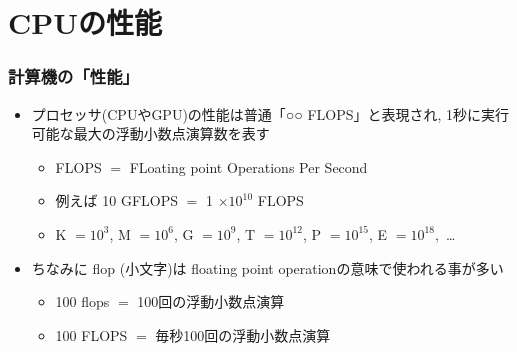 \documentclass[10pt,dvipdfmx]{beamer}
\newcommand{\ao}[1]{{\color{blue}#1}}
\begin{document}
\section{CPUの性能}

\begin{frame}
  \frametitle{計算機の「性能」}
  \begin{itemize}
  \item<1-> プロセッサ(CPUやGPU)の性能は普通\ao{「○○ FLOPS」}と表現され,
    1秒に実行可能な最大の\ao{浮動小数点演算数}を表す
    \begin{itemize}
    \item<2-> \ao{FLOPS} $=$ \ao{FL}oating point \ao{O}perations
      \ao{P}er \ao{S}econd
    \item<3-> 例えば 10 GFLOPS $=$ 1 $\times 10^{10}$ FLOPS
    \item<3->
      K $= 10^3$,
      M $= 10^6$,
      G $= 10^9$,
      T $= 10^{12}$,
      P $= 10^{15}$,
      E $= 10^{18},$ \ldots
    \end{itemize}
  \item<4-> ちなみに \ao{flop (小文字)}は
    \ao{floating point operation}の意味で使われる事が多い
    \begin{itemize}
    \item 100 flops $=$ 100回の浮動小数点演算
    \item 100 FLOPS $=$ 毎秒100回の浮動小数点演算
    \end{itemize}
  \end{itemize}
\end{frame}
\end{document}
